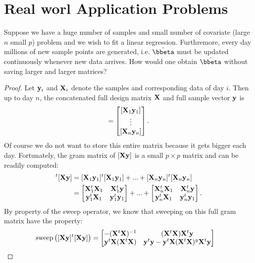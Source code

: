 \section{Real worl Application Problems}

\begin{problembox}{}{}
Suppose we have a huge number of samples and small number of covariate (large $n$ small $p$) problem and we wish to fit a linear regression. Furthremore, every day millions of new sample points are generated, i.e. $\hat{\bbeta}$ must be updated continuously whenever new data arrives. How would one obtain $\hat{\bbeta}$ without saving larger and larger matrices?
\end{problembox}

\begin{proof}
Let $\mathbf{y}_i$ and $\mathbf{X}_i$ denote the samples and corresponding data of day $i$. Then up to day $n$, the concatenated full design matrix $\mathbf{X}$ and full sample vector $\mathbf{y}$ is 
\begin{align*}
	[\bX \by ] = 
	\begin{bmatrix}
		[\bX_1 \by_1] \\
		\vdots \\
		[\bX_n \by_n]
	\end{bmatrix}.
\end{align*}
Of course we do not want to store this entire matrix because it gets bigger each day. Fortunately, the gram matrix of $[\mathbf{X} \mathbf{y} ]$ is a small $p \times p$ matrix and can be readily computed:
\begin{align*}
	[\bX \by ]^t[\bX \by ] 
	&= [\bX_1\by_1]^t[\bX_1\by_1] + ... + [\bX_n\by_n]^t[\bX_n\by_n]\\
	&= 
	\begin{bmatrix}
		\bX_1^t\bX_1 & \bX_1^t \by\\
		\by_1^t\bX_1 & \by_1^t \by_1
	\end{bmatrix}
	+ ... + 
	\begin{bmatrix}
		\bX_n^t\bX_1 & \bX_n^t \by\\
		\by_n^t\bX_1 & \by_n^t \by_1
	\end{bmatrix}.
\end{align*}
By property of the sweep operator, we know that sweeping on this full gram matrix have the property:
\begin{align*}
	\text{sweep}\left([\mathbf{X} \mathbf{y} ]^t[\mathbf{X} \mathbf{y} ]\right)
	&= 
	\begin{bmatrix}
		- (\mathbf{X}^t \mathbf{X})^{-1} & (\mathbf{X}^t \mathbf{X})\mathbf{X}^t \mathbf{y}\\
		\mathbf{y}^t\mathbf{X}(\mathbf{X}^t \mathbf{X}) & \mathbf{y}^t \mathbf{y} - \mathbf{y}^t\mathbf{X}(\mathbf{X}^t \mathbf{X})^y\mathbf{X}^t\mathbf{y}

\end{bmatrix}
\end{align*}
\end{proof}
